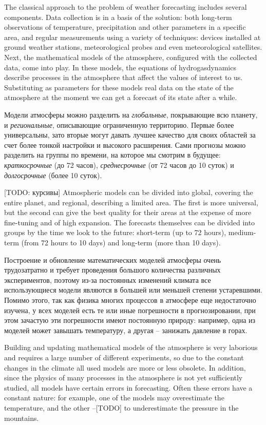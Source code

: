 \documentclass[14pt]{matmex-diploma}
\begin{document}
The classical approach to the problem of weather forecasting includes several components. Data collection is in a basis of the solution: both long-term observations of temperature, precipitation and other parameters in a specific area, and regular measurements using a variety of techniques: devices installed at ground weather stations, meteorological probes and even meteorological satellites. Next, the mathematical models of the atmosphere, configured with the collected data, come into play. In these models, the equations of hydrogasdynamics describe processes in the atmosphere that affect the values of interest to us. Substituting as parameters for these models real data on the state of the atmosphere at the moment we can get a forecast of its state after a while.

Модели атмосферы можно разделить на \textit{глобальные}, покрывающие всю планету, и \textit{региональные}, описывающие ограниченную территорию. Первые более универсальны, зато вторые могут давать лучшее качество для своих областей за счет более тонкой настройки и высокого расширения. Сами прогнозы можно разделить на группы по времени, на которое мы смотрим в будущее: \textit{краткосрочные} (до 72 часов), \textit{среднесрочные} (от 72 часов до 10 суток) и \textit{долгосрочные} (более 10 суток).

[TODO: курсивы] Atmospheric models can be divided into global, covering the entire planet, and regional, describing a limited area. The first is more universal, but the second can give the best quality for their areas at the expense of more fine-tuning and of high expansion. The forecasts themselves can be divided into groups by the time we look to the future: short-term (up to 72 hours), medium-term (from 72 hours to 10 days) and long-term (more than 10 days).

Построение и обновление математических моделей атмосферы очень трудозатратно и требует проведения большого количества различных экспериментов, поэтому из-за постоянных изменений климата все использующиеся модели являются в большей или меньшей степени устаревшими. Помимо этого, так как физика многих процессов в атмосфере еще недостаточно изучена, у всех моделей есть те или иные погрешности в прогнозировании, при этом зачастую эти погрешности имеют постоянную природу: например, одна из моделей может завышать температуру, а другая -- занижать давление в горах.

Building and updating mathematical models of the atmosphere is very laborious and requires a large number of different experiments, so due to the constant changes in the climate all used models are more or less obsolete. In addition, since the physics of many processes in the atmosphere is not yet sufficiently studied, all models have certain errors in forecasting. Often these errors have a constant nature: for example, one of the models may overestimate the temperature, and the other --[TODO] to underestimate the pressure in the mountains.
\end{document}
